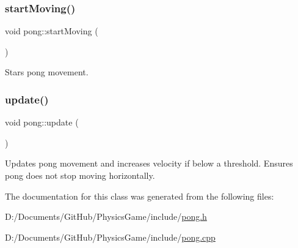 \mbox{\label{classpong_af5da04e472da35472a1ad0229e36480a}} 
\subsubsection{\texorpdfstring{start\+Moving()}{startMoving()}}
{\footnotesize\ttfamily void pong\+::start\+Moving (\begin{DoxyParamCaption}{ }\end{DoxyParamCaption})}



Stars pong movement. 

\mbox{\label{classpong_a2f36425bd4f142cf23efb4928a49f183}} 
\subsubsection{\texorpdfstring{update()}{update()}}
{\footnotesize\ttfamily void pong\+::update (\begin{DoxyParamCaption}{ }\end{DoxyParamCaption})}



Updates pong movement and increases velocity if below a threshold. Ensures pong does not stop moving horizontally. 



The documentation for this class was generated from the following files\+:\begin{DoxyCompactItemize}
\item 
D\+:/\+Documents/\+Git\+Hub/\+Physics\+Game/include/\hyperlink{pong_8h}{pong.\+h}\item 
D\+:/\+Documents/\+Git\+Hub/\+Physics\+Game/include/\hyperlink{pong_8cpp}{pong.\+cpp}\end{DoxyCompactItemize}
